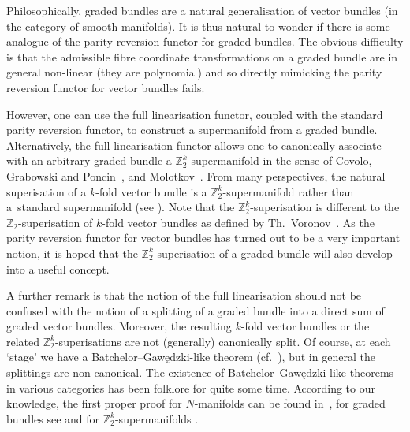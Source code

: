 \documentclass[10pt,a4paper]{amsart}
\numberwithin{equation}{section}
\begin{document}
Philosophically, graded bundles are a natural generalisation of vector bundles (in the category of smooth manifolds). It is thus natural to wonder if there is some analogue of the parity reversion functor for graded bundles. The obvious dif\/f\/iculty is that the admissible f\/ibre coordinate transformations on a graded bundle are in general non-linear (they are polynomial) and so directly mimicking the parity reversion functor for vector bundles fails.

However, one can use the full linearisation functor, coupled with the standard parity reversion functor, to construct a supermanifold from a graded bundle. Alternatively, the full linearisation functor allows one to canonically associate with an arbitrary graded bundle a $\mathbb{Z}_{2}^{k}$-supermanifold in the sense of Covolo, Grabowski and Poncin~\cite{Covolo:2014a,Covolo:2014b}, and Molotkov~\cite{Molotkov:2010}. From many perspectives, the natural superisation of a $k$-fold vector bundle is a $\mathbb{Z}_{2}^{k}$-supermanifold rather than a~standard supermanifold (see \cite[Proposition~6.1]{Covolo:2014a}). Note that the $\mathbb{Z}_{2}^{k}$-superisation is dif\/ferent to the $\mathbb{Z}_{2}$-superisation of $k$-fold vector bundles as def\/ined by Th.~Voronov~\cite{Voronov:2012}. As the parity reversion functor for vector bundles has turned out to be a very important notion, it is hoped that the $\mathbb{Z}_{2}^{k}$-superisation of a graded bundle will also develop into a useful concept.

A further remark is that the notion of the full linearisation should not be confused with the notion of a splitting of a graded bundle into a direct sum of graded vector bundles. Moreover, the resulting $k$-fold vector bundles or the related $\mathbb{Z}_{2}^{k}$-superisations are not (generally) canonically split. Of course, at each `stage' we have a Batchelor--Gaw\k{e}dzki-like theorem (cf.~\cite{Batchelor:1979,Gawedzki:1977}), but in general the splittings are non-canonical. The existence of Batchelor--Gaw\k{e}dzki-like theorems in various categories has been folklore for quite some time. According to our knowledge, the f\/irst proper proof for $N$-manifolds can be found in~\cite{Bonavolonta:2013}, for graded bundles see \cite{Bruce:2014} and for $\mathbb{Z}_{2}^{k}$-supermanifolds \cite{Covolo:2014b}.
\end{document}
